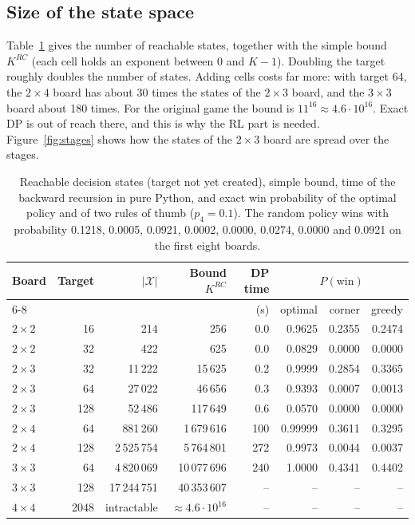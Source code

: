 \documentclass[11pt,a4paper]{article}
\theoremstyle{remark}
\newcommand{\X}{\mathcal{X}}
\begin{document}
\subsection{Size of the state space}

Table~\ref{tab:states} gives the number of reachable states, together with the simple bound $K^{RC}$ (each cell holds an exponent between $0$ and $K-1$). Doubling the target roughly doubles the number of states. Adding cells costs far more: with target 64, the $2\times4$ board has about 30 times the states of the $2\times3$ board, and the $3\times3$ board about 180 times. For the original game the bound is $11^{16}\approx4.6\cdot10^{16}$. Exact DP is out of reach there, and this is why the RL part is needed. Figure~\ref{fig:stages} shows how the states of the $2\times3$ board are spread over the stages.

\begin{table}[ht]
\centering
\begin{tabular}{lrrrrrrr}
\toprule
Board & Target & $|\X|$ & Bound $K^{RC}$ & DP time & \multicolumn{3}{c}{$P(\text{win})$}\\
\cmidrule(lr){6-8}
 & & & & (s) & optimal & corner & greedy\\
\midrule
$2\times2$ & 16 & 214 & 256 & 0.0 & 0.9625 & 0.2355 & 0.2474\\
$2\times2$ & 32 & 422 & 625 & 0.0 & 0.0829 & 0.0000 & 0.0000\\
$2\times3$ & 32 & 11\,222 & 15\,625 & 0.2 & 0.9999 & 0.2854 & 0.3365\\
$2\times3$ & 64 & 27\,022 & 46\,656 & 0.3 & 0.9393 & 0.0007 & 0.0013\\
$2\times3$ & 128 & 52\,486 & 117\,649 & 0.6 & 0.0570 & 0.0000 & 0.0000\\
$2\times4$ & 64 & 881\,260 & 1\,679\,616 & 100 & 0.99999 & 0.3611 & 0.3295\\
$2\times4$ & 128 & 2\,525\,754 & 5\,764\,801 & 272 & 0.9973 & 0.0044 & 0.0037\\
$3\times3$ & 64 & 4\,820\,069 & 10\,077\,696 & 240 & 1.0000 & 0.4341 & 0.4402\\
$3\times3$ & 128 & 17\,244\,751 & 40\,353\,607 & -- & -- & -- & --\\
$4\times4$ & 2048 & intractable & $\approx 4.6\cdot10^{16}$ & -- & -- & -- & --\\
\bottomrule
\end{tabular}
\caption{Reachable decision states (target not yet created), simple bound, time of the backward recursion in pure Python, and exact win probability of the optimal policy and of two rules of thumb ($p_4=0.1$). The random policy wins with probability 0.1218, 0.0005, 0.0921, 0.0002, 0.0000, 0.0274, 0.0000 and 0.0921 on the first eight boards.}
\label{tab:states}
\end{table}
\end{document}
